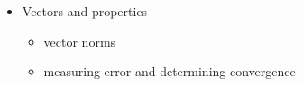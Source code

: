 \documentclass[12pt]{article}
\newcommand{\ve}[1]{\ensuremath{\mathbf{#1}}}
\begin{document}
\begin{itemize}
\item Vectors and properties
  \begin{itemize}
  \item vector norms
  \item measuring error and determining convergence
  \end{itemize}


\end{itemize}
\end{document}
